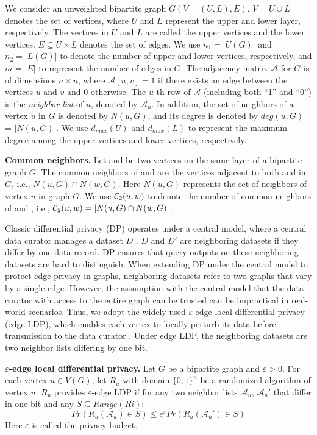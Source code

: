 We consider an unweighted bipartite graph $G(V=(U,L),E)$. $V=U\cup L$ denotes the set of vertices, where $U$ and $L$ represent the upper and lower layer, respectively. The vertices in $U$ and $L$ are called the upper vertices and the lower vertices. $E \subseteq U \times L$ denotes the set of edges. We use $n_1 = |U(G)|$ and $n_2 = |L(G)|$ to denote the number of upper and lower vertices, respectively, and $m$ = $|E|$ to represent the number of edges in $G$. The adjacency matrix $\mathcal{A}$ for $G$ is of dimensions $n \times n$, where $\mathcal{A}[u,v]=1$ if there exists an edge between the vertices $u$ and $v$ and $0$ otherwise. The $u$-th row of $\mathcal{A}$ (including both ``1'' and ``0'') is the {\em neighbor list} of $u$, denoted by $\mathcal{A}_u$. In addition, the set of neighbors of a vertex $u$ in $G$ is denoted by $N(u,G)$, and its degree is denoted by $deg(u,G)$ = $|N(u,G)|$. We use $d_{max}(U)$ and $d_{max}(L)$ to represent the maximum degree among the upper vertices and lower vertices, respectively. 
\begin{definition}
\label{def:pqx}
{\bf Common neighbors.} 
Let \vq and \vx be two vertices on the same layer of a bipartite graph $G$. 
The common neighbors of \vq and \vx are the vertices adjacent to both \vq and \vx in $G$, i.e., $N(u, G) \cap N(w, G)$. Here $N(u, G)$ represents the set of neighbors of vertex $u$ in graph $G$. 
We use $\mathcal{C}_2(u,w)$ to denote the number of common neighbors of \vq and \vx, 
i.e., $\mathcal{C}_2(u,w) = |N(u, G) \cap N(w, G)|$. 
\end{definition}

Classic differential privacy (DP) operates under a central model, where a central data curator manages a dataset $D$ \cite{dwork2014algorithmic}. $D$ and $D'$ are neighboring datasets if they differ by one data record. DP ensures that query outputs on these neighboring datasets are hard to distinguish. 
When extending DP under the central model to protect edge privacy in graphs, neighboring datasets refer to two graphs that vary by a single edge. 
However, the assumption with the central model that the data curator with access to the entire graph can be trusted can be impractical in real-world scenarios. 
Thus, we adopt the widely-used $\varepsilon$-edge local differential privacy (edge LDP), which enables each vertex to locally perturb its data before transmission to the data curator \cite{qin2017generating, zhang2018two, ye2020lf}. Under edge LDP, the neighboring datasets are two neighbor lists differing by one bit. 

\begin{definition} 
\label{def:ldp}
{\bf $\varepsilon$-edge local differential privacy.} 
Let $G$ be a bipartite graph and $\varepsilon>0$. 
For each vertex $u \in V(G)$, let $R_u$ with domain $\{0, 1\}^n$ be a randomized algorithm of vertex $u$. 
$R_u$ provides $\varepsilon$-edge LDP if for any two neighbor lists $\mathcal{A}_u$, $\mathcal{A}_u'$ that differ in one bit and any $S \subseteq Range(Ri)$: 
$$ Pr(R_u(\mathcal{A}_u) \in S  ) \leq e^{\varepsilon}  Pr(R_{u}(\mathcal{A}_u') \in S  ) $$
Here $\varepsilon$ is called the privacy budget. 
\end{definition}

